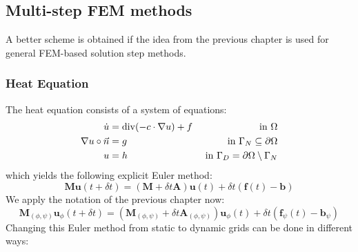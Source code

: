 \documentclass{IOS-Book-Article}
\theoremstyle{plain}
\theoremstyle{definition}
\DeclareMathOperator{\diverg}{div}
\begin{document}
\subsection{Multi-step FEM methods}
A better scheme is obtained if the idea from the previous chapter is used for general FEM-based solution step methods.

\subsubsection{Heat Equation}

The heat equation consists of a system of equations:
\begin{align*}
	\dot u &= \diverg (- c \cdot \nabla u) + f & \textnormal{ in } \Omega \\
	\nabla u \circ \vec{n} &= g & \textnormal{ in } \Gamma_N \subseteq \partial \Omega \\
	u  &= h & \textnormal{ in } \Gamma_D = \partial \Omega \setminus \Gamma_N
\end{align*}
which yields the following explicit Euler method:
\begin{equation*}
	\mathbf M \mathbf u(t + \delta t) = (\mathbf M + \delta t \mathbf A) \mathbf{u} (t) + \delta t (\mathbf f(t) - \mathbf b)
\end{equation*}
We apply the notation of the previous chapter now:
\begin{equation*}
 \mathbf M_{(\phi, \psi)} \mathbf u_\phi(t + \delta t) = (\mathbf M_{(\phi, \psi)} + \delta t \mathbf A_{(\phi, \psi)}) \mathbf u_\phi(t) + \delta t (\mathbf f_\psi(t) - \mathbf b_\psi)
\end{equation*}
Changing this Euler method from static to dynamic grids can be done in different ways:
\end{document}
